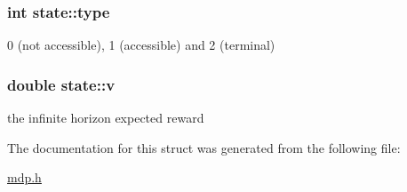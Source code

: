 \subsubsection[{\texorpdfstring{type}{type}}]{\setlength{\rightskip}{0pt plus 5cm}int state\+::type}\hypertarget{structstate_a8f960cbbf1b94dee7dc6cf2fe3b5c4c4}{}\label{structstate_a8f960cbbf1b94dee7dc6cf2fe3b5c4c4}
0 (not accessible), 1 (accessible) and 2 (terminal) 
\subsubsection[{\texorpdfstring{v}{v}}]{\setlength{\rightskip}{0pt plus 5cm}double state\+::v}\hypertarget{structstate_ac3c8aa16b56a2a479a78906a4f730786}{}\label{structstate_ac3c8aa16b56a2a479a78906a4f730786}
the infinite horizon expected reward 

The documentation for this struct was generated from the following file\+:\begin{DoxyCompactItemize}
\item 
\hyperlink{mdp_8h}{mdp.\+h}\end{DoxyCompactItemize}
